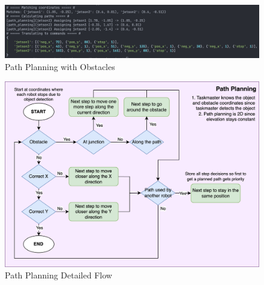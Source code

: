 \begin{figure} [H]
    \centering
    \includegraphics[width=0.9\linewidth]{assets/images/path_planning/path_with_obstacles.png}
    \caption{Path Planning with Obstacles}
    \label{fig:path-with-obstacles}
\end{figure}

\begin{figure} [H]
    \centering
    \includegraphics[width=0.9\linewidth]{assets/images/path_planning/path-planning-flow.png}
    \caption{Path Planning Detailed Flow}
    \label{fig:path-planning-flow}
\end{figure}
